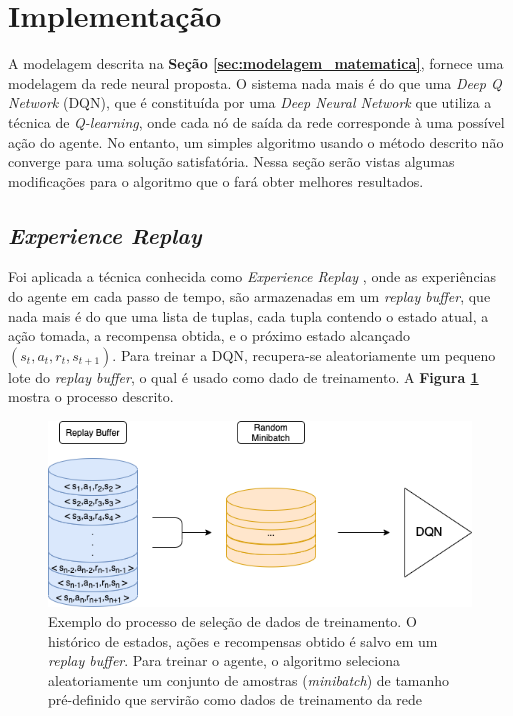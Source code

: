 
\section{Implementação} %
\label{sec:implementacao}

A modelagem descrita na \textbf{Seção \ref{sec:modelagem_matematica}}, fornece uma modelagem da rede neural proposta. O sistema nada mais é do que uma \textit{Deep Q Network} (DQN), que é constituída por uma \textit{Deep Neural Network} \cite{Goodfellow-et-al-2016} que utiliza a técnica de \textit{Q-learning}, onde cada nó de saída da rede corresponde à uma possível ação do agente. No entanto, um simples algoritmo usando o método descrito não converge para uma solução satisfatória. Nessa seção serão vistas algumas modificações para o algoritmo que o fará obter melhores resultados.

\subsection{\textit{Experience Replay}} %
\label{ssub:experience_replay}

Foi aplicada a técnica conhecida como \textit{Experience Replay} \cite{Lin1992ReinforcementLF}, onde as experiências do agente em cada passo de tempo, são armazenadas em um \textit{replay buffer}, que nada mais é do que uma lista de tuplas, cada tupla contendo o estado atual, a ação tomada, a recompensa obtida, e o próximo estado alcançado $(s_t,a_t,r_t,s_{t+1})$. Para treinar a DQN, recupera-se aleatoriamente um pequeno lote do \textit{replay buffer}, o qual é usado como dado de treinamento. A \textbf{Figura \ref{fig:exp_rep}} mostra o processo descrito.


\begin{figure}[h]
  \centering
  \includegraphics[width=.7 \textwidth]{conteudo/imgs/experience_replay.png}
  \caption[\textit{Experience Replay}]{Exemplo do processo de seleção de dados de treinamento. O histórico de estados, ações e recompensas obtido é salvo em um \textit{replay buffer}. Para treinar o agente, o algoritmo seleciona aleatoriamente um conjunto de amostras (\textit{minibatch}) de tamanho pré-definido que servirão como dados de treinamento da rede}
  \label{fig:exp_rep}
\end{figure} 

